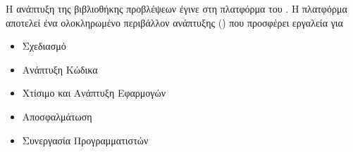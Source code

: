 Η ανάπτυξη της βιβλιοθήκης προβλέψεων έγινε στη πλατφόρμα του . Η πλατφόρμα αποτελεί ένα ολοκληρωμένο περιβάλλον ανάπτυξης () που προσφέρει εργαλεία για

\begin{itemize}
    \item Σχεδιασμό
    \item Ανάπτυξη Κώδικα
    \item Χτίσιμο και Ανάπτυξη Εφαρμογών
    \item Αποσφαλμάτωση 
    \item Συνεργασία Προγραμματιστών
\end{itemize}



